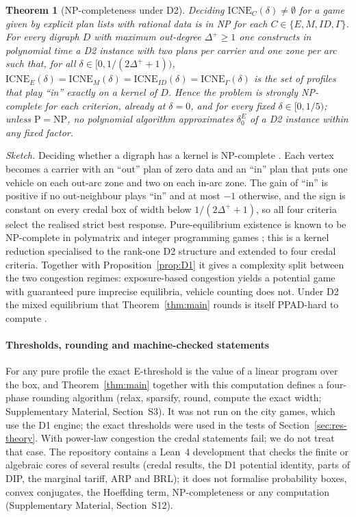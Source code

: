 \documentclass[preprint,11pt]{elsarticle}
\newtheorem{theorem}{Theorem}
\theoremstyle{definition}
\theoremstyle{remark}
\newcommand{\ICNE}{\mathrm{ICNE}}
\newcommand{\SM}[1]{Supplementary Material, Section~#1}
\begin{document}
\begin{theorem}[NP-completeness under D2]\label{thm:np}
Deciding $\ICNE_C(\delta)\neq\emptyset$ for a game given by explicit plan lists with rational data is in NP for each $C\in\{E,M,ID,\Gamma\}$. For every digraph $D$ with maximum out-degree $\Delta^+\ge1$ one constructs in polynomial time a D2 instance with two plans per carrier and one zone per arc such that, for all $\delta\in[0,1/(2\Delta^++1))$, $\ICNE_E(\delta)=\ICNE_M(\delta)=\ICNE_{ID}(\delta)=\ICNE_\Gamma(\delta)$ is the set of profiles that play ``in'' exactly on a kernel of $D$. Hence the problem is strongly NP-complete for each criterion, already at $\delta=0$, and for every fixed $\delta\in[0,1/5)$; unless $\mathrm P=\mathrm{NP}$, no polynomial algorithm approximates $\delta_0^E$ of a D2 instance within any fixed factor.
\end{theorem}
\emph{Sketch.} Deciding whether a digraph has a kernel is NP-complete \citep{Chvatal1973,Fraenkel1981}. Each vertex becomes a carrier with an ``out'' plan of zero data and an ``in'' plan that puts one vehicle on each out-arc zone and two on each in-arc zone. The gain of ``in'' is positive if no out-neighbour plays ``in'' and at most $-1$ otherwise, and the sign is constant on every credal box of width below $1/(2\Delta^++1)$, so all four criteria select the realised strict best response. Pure-equilibrium existence is known to be NP-complete in polymatrix and integer programming games \citep{Apt2022,Carvalho2022}; this is a kernel reduction specialised to the rank-one D2 structure and extended to four credal criteria. Together with Proposition~\ref{prop:D1} it gives a complexity split between the two congestion regimes: exposure-based congestion yields a potential game with guaranteed pure imprecise equilibria, vehicle counting does not. Under D2 the mixed equilibrium that Theorem~\ref{thm:main} rounds is itself PPAD-hard to compute \citep{Chen2009,Daskalakis2009}.

\paragraph{Thresholds, rounding and machine-checked statements} For any pure profile the exact E-threshold is the value of a linear program over the box, and Theorem~\ref{thm:main} together with this computation defines a four-phase rounding algorithm (relax, sparsify, round, compute the exact width; \SM{S3}). It was not run on the city games, which use the D1 engine; the exact thresholds were used in the tests of Section~\ref{sec:res-theory}. With power-law congestion the credal statements fail; we do not treat that case. The repository contains a Lean~4 development that checks the finite or algebraic cores of several results (credal results, the D1 potential identity, parts of DIP, the marginal tariff, ARP and BRL); it does not formalise probability boxes, convex conjugates, the Hoeffding term, NP-completeness or any computation (\SM{S12}).
\end{document}
